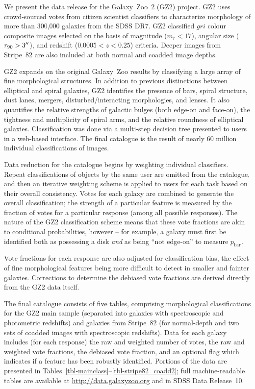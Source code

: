 \documentclass[useAMS,usenatbib]{mn2e}
\begin{document}
We present the data release for the Galaxy~Zoo~2 (GZ2) project. GZ2 uses crowd-sourced votes from citizen scientist classifiers to characterize morphology of more than 300,000 galaxies from the SDSS DR7. GZ2 classified $gri$ colour composite images selected on the basis of magnitude ($m_r<17$), angular size ($r_{90}>3\hbox{$^{\prime\prime}$}$), and redshift ($0.0005<z<0.25$) criteria. Deeper images from Stripe~82 are also included at both normal and coadded image depths. 

GZ2 expands on the original Galaxy~Zoo results by classifying a large array of fine morphological structures. In addition to previous distinctions between elliptical and spiral galaxies, GZ2 identifies the presence of bars, spiral structure, dust lanes, mergers, disturbed/interacting morphologies, and lenses. It also quantifies the relative strengths of galactic bulges (both edge-on and face-on), the tightness and multiplicity of spiral arms, and the relative roundness of elliptical galaxies. Classification was done via a multi-step decision tree presented to users in a web-based interface. The final catalogue is the result of nearly 60 million individual classifications of images.

Data reduction for the catalogue begins by weighting individual classifiers. Repeat classifications of objects by the same user are omitted from the catalogue, and then an iterative weighting scheme is applied to users for each task based on their overall consistency. Votes for each galaxy are combined to generate the overall classification; the strength of a particular feature is measured by the fraction of votes for a particular response (among all possible responses). The nature of the GZ2 classification scheme means that these vote fractions are akin to conditional probabilities, however -- for example, a galaxy must first be identified both as possessing a disk {\em and} as being ``not edge-on'' to measure $p_\mathrm{bar}$.

Vote fractions for each response are also adjusted for classification bias, the effect of fine morphological features being more difficult to detect in smaller and fainter galaxies. Corrections to determine the debiased vote fractions are derived directly from the GZ2 data itself. 

The final catalogue consists of five tables, comprising morphological classifications for the GZ2 main sample (separated into galaxies with spectroscopic and photometric redshifts) and galaxies from Stripe~82 (for normal-depth and two sets of coadded images with spectroscopic redshifts). Data for each galaxy includes (for each response) the raw and weighted number of votes, the raw and weighted vote fractions, the debiased vote fraction, and an optional flag which indicates if a feature has been robustly identified. Portions of the data are presented in Tables~\ref{tbl-mainclass}--\ref{tbl-stripe82_coadd2}; full machine-readable tables are available at \url{http://data.galaxyzoo.org} and in SDSS Data Release~10. 
\end{document}

